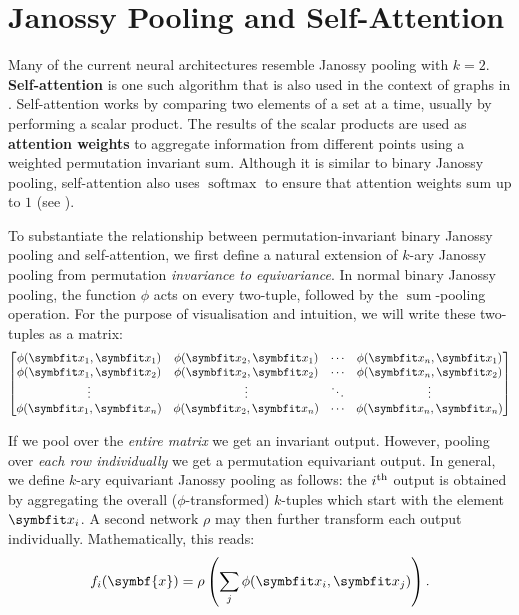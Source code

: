 \section{Janossy Pooling and Self-Attention}\label{sec:jan-attn}

Many of the current neural architectures resemble Janossy pooling with $k=2$.
\textbf{Self-attention} \parencite{vaswani2017attention} is one such algorithm that is also used in the context of graphs in \samptr. Self-attention works by comparing two elements of a set at a time, usually by performing a scalar product.
The results of the scalar products are used as \textbf{attention weights} to aggregate information from different points using a weighted permutation invariant sum. Although it is similar to binary Janossy pooling, self-attention also uses $\operatorname{softmax}$ to ensure that attention weights sum up to $1$ (see ).

To substantiate the relationship between permutation-invariant binary Janossy pooling and self-attention, we first define a natural extension of $k$-ary Janossy pooling from permutation \textit{invariance to equivariance}. In normal binary Janossy pooling, the function $\phi$ acts on every two-tuple, followed by the $\operatorname{sum}$-pooling operation. For the purpose of visualisation and intuition, we will write these two-tuples as a matrix:
\begin{equation}
    \begin{bmatrix}
    \phi(\bfitx_1, \bfitx_1) & \phi(\bfitx_2, \bfitx_1) & \cdots & \phi(\bfitx_n, \bfitx_1) \\
    \phi(\bfitx_1, \bfitx_2) & \phi(\bfitx_2, \bfitx_2) & \cdots & \phi(\bfitx_n, \bfitx_2) \\
    \vdots                   &  \vdots              & \ddots & \vdots         \\
    \phi(\bfitx_1, \bfitx_n) & \phi(\bfitx_2, \bfitx_n) & \cdots & \phi(\bfitx_n, \bfitx_n)
    \end{bmatrix}
    \label{eqn:jan-attn-matrix}
\end{equation}

If we pool over the \textit{entire matrix} we get an invariant output. However, pooling over \textit{each row individually} we get a permutation equivariant output.
In general, we define $k$-ary equivariant Janossy pooling as follows: the $i\textsuperscript{th}$ output is obtained by aggregating the overall ($\phi$-transformed) $k$-tuples which start with the element $\bfitx_i$. A second network $\rho$ may then further transform each output individually. Mathematically, this reads:
\begin{equation}
    f_i(\symbf{x}) = \rho \left( \sum_j \phi(\bfitx_i, \bfitx_j) \right).
    \label{eqn:janossy-attention}
\end{equation}

